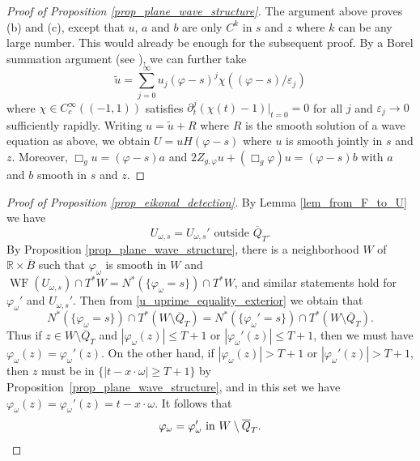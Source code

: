 \documentclass[11pt,letterpaper]{amsart}
\theoremstyle{definition}
\numberwithin{equation}{section}
\newcommand{\mR}{\mathbb{R}}                    %
\newcommand{\ol}[1]{\overline{#1}}
\newcommand{\eps}{\varepsilon}
\newcommand{\p}{\partial}
\def\p{\partial}
\DeclareMathOperator{\WF}{WF}
\begin{document}
\begin{proof}[Proof of Proposition \ref{prop_plane_wave_structure}]
The argument above proves (b) and (c), except that $u$, $a$ and $b$ are only $C^k$ in $s$ and $z$ where $k$ can be any large number. This would already be enough for the subsequent proof. By a Borel summation argument (see \cite[Theorem 1.2.6]{hormander}), we can further take 
\[
\tilde{u} = \sum_{j=0}^{\infty} u_j(\varphi-s)^j \chi((\varphi-s)/\eps_j)
\]
where $\chi \in C^{\infty}_c((-1,1))$ satisfies $\p_t^j(\chi(t)-1)|_{t=0} = 0$ for all $j$ and $\eps_j \to 0$ sufficiently rapidly. Writing $u = \tilde{u} + R$ where $R$ is the smooth solution of a wave equation as above, we obtain  $U = u H(\varphi-s)$ where $u$ is smooth jointly in $s$ and $z$. Moreover, $\Box_g u = (\varphi-s) a$ and $2 Z_{g,\varphi} u + (\Box_g \varphi) u = (\varphi-s) b$ with $a$ and $b$ smooth in $s$ and $z$.
\end{proof}




\begin{proof}[Proof of Proposition \ref{prop_eikonal_detection}]
By Lemma \ref{lem_from_F_to_U} we have 
\begin{equation} \label{u_uprime_equality_exterior}
U_{\omega,s} = U_{\omega,s}' \text{ outside $\ol{Q}_T$}.
\end{equation}
By Proposition \ref{prop_plane_wave_structure}, there is a neighborhood $W$ of $\mR \times \ol{B}$ such that $\varphi_{\omega}$ is smooth in $W$ and $\WF(U_{\omega,s}) \cap T^* W = N^*(\{ \varphi_{\omega} =s \}) \cap T^*W$, and similar statements hold for $\varphi_{\omega}'$ and $U_{\omega,s}'$. Then from \eqref{u_uprime_equality_exterior} we obtain that 
\[
N^*(\{ \varphi_{\omega} =s \}) \cap T^*(W \setminus \ol{Q}_T) = N^*(\{ \varphi_{\omega}'=s \}) \cap T^*(W \setminus \ol{Q}_T).
\]
Thus if $z \in W \setminus  \ol{Q}_T$ and $|\varphi_{\omega}(z)| \leq T+1$ or $|\varphi_{\omega}'(z)| \leq T+1$, then we must have $\varphi_{\omega}(z) = \varphi_{\omega}'(z)$. On the other hand, if $|\varphi_{\omega}(z)| > T+1$ or $|\varphi_{\omega}'(z)| > T+1$, then $z$ must be in $\{ |t - x \cdot \omega| \geq T+1 \}$ by Proposition~\ref{prop_plane_wave_structure}, and in this set we have $\varphi_{\omega}(z) = \varphi_{\omega}'(z) = t - x \cdot \omega$. It follows that 
\[
\varphi_{\omega} = \varphi_{\omega}' \text{ in $W \setminus \ol{Q}_T$}. \qedhere
\]
\end{proof}
\end{document}
